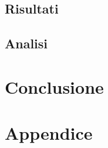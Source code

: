 \documentclass[target=bach,aauheader=,style=]{thud}
\begin{document}
	\section{Risultati}
	
	\section{Analisi}
\chapter{Conclusione}



\appendix


\chapter{Appendice}


\backmatter





\end{document}
